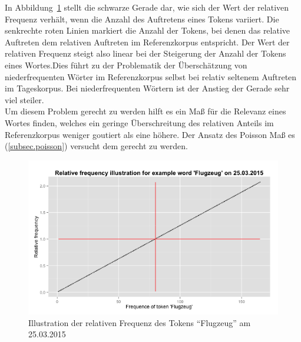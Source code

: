 In Abbildung~\ref{pic.rel_freq} stellt die schwarze Gerade dar, wie sich der Wert der relativen Frequenz verhält, wenn die Anzahl des Auftretens eines Tokens variiert. Die senkrechte roten Linien markiert die Anzahl der Tokens, bei denen das relative Auftreten dem relativen Auftreten im Referenzkorpus entspricht. Der Wert der relativen Frequenz steigt also linear bei der Steigerung der Anzahl der Tokens eines Wortes.Dies führt zu der Problematik der Überschätzung von niederfrequenten Wörter im Referenzkorpus selbst bei relativ seltenem Auftreten im Tageskorpus. Bei niederfrequenten Wörtern ist der Anstieg der Gerade sehr viel steiler.\\
Um diesem Problem gerecht zu werden hilft es ein Maß für die Relevanz eines Wortes finden, welches ein geringe Überschreitung des relativen Anteils im Referenzkorpus weniger goutiert als eine höhere. Der Ansatz des Poisson Maß es (\ref{subsec.poisson}) versucht dem gerecht zu werden.\\
\begin{figure}[h!]
    \centering
    \includegraphics[width=1\textwidth]{pictures/relfreqFlugzeug.png}
    \caption{Illustration der relativen Frequenz des Tokens \enquote{Flugzeug} am 25.03.2015}\label{pic.rel_freq}
\end{figure}




